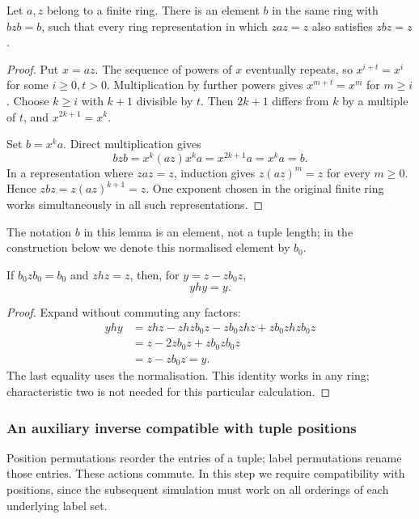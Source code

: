 \begin{lemma}\label{lem:normal}
Let $a,z$ belong to a finite ring. There is an element $b$ in the same ring with $bzb=b$, such that every ring representation in which $zaz=z$ also satisfies $zbz=z$.
\end{lemma}
\begin{proof}
Put $x=az$. The sequence of powers of $x$ eventually repeats, so $x^{i+t}=x^i$ for some $i\ge0,t>0$. Multiplication by further powers gives $x^{m+t}=x^m$ for $m\ge i$. Choose $k\ge i$ with $k+1$ divisible by $t$. Then $2k+1$ differs from $k$ by a multiple of $t$, and $x^{2k+1}=x^k$.

Set $b=x^ka$. Direct multiplication gives
\[bzb=x^k(az)x^ka=x^{2k+1}a=x^ka=b.\]
In a representation where $zaz=z$, induction gives $z(az)^m=z$ for every $m\ge0$. Hence $zbz=z(az)^{k+1}=z$. One exponent chosen in the original finite ring works simultaneously in all such representations.
\end{proof}
The notation $b$ in this lemma is an element, not a tuple length; in the construction below we denote this normalised element by $b_0$.

\begin{lemma}\label{lem:residual}
If $b_0zb_0=b_0$ and $zhz=z$, then, for $y=z-zb_0z$,
\[yhy=y.\]
\end{lemma}
\begin{proof}
Expand without commuting any factors:
\begin{align*}
yhy&=zhz-zhzb_0z-zb_0zhz+zb_0zhzb_0z\\
&=z-2zb_0z+zb_0zb_0z\\
&=z-zb_0z=y.
\end{align*}
The last equality uses the normalisation. This identity works in any ring; characteristic two is not needed for this particular calculation.
\end{proof}

\subsubsection{An auxiliary inverse compatible with tuple positions}
Position permutations reorder the entries of a tuple; label
permutations rename those entries. These actions commute. In this
step we require compatibility with positions, since the subsequent
simulation must work on all orderings of each underlying label set.

